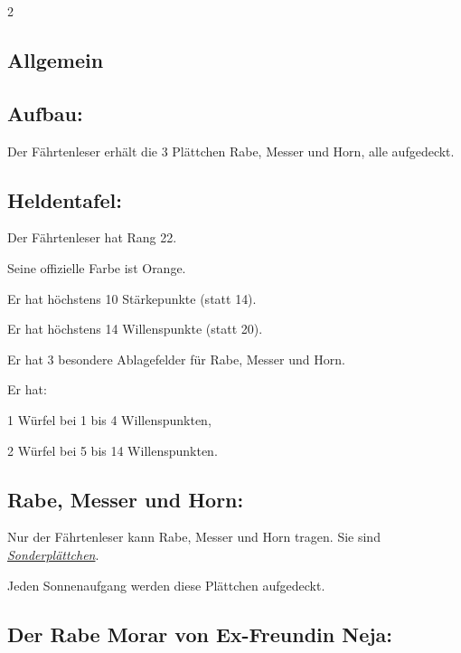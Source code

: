 \documentclass[10pt, a4paper, oneside]{book}
\newcommand{\fan}[1]{\textit{#1}}
\begin{document}
\begin{multicols*}{2}\raggedcolumns


\begin{nobgcolor}

\section{Allgemein}


\subsection{Aufbau:}

Der Fährtenleser erhält die 3 Plättchen Rabe, Messer und Horn, alle aufgedeckt.



\subsection{Heldentafel:}

Der Fährtenleser hat Rang 22.

Seine offizielle Farbe ist Orange.

Er hat höchstens 10 Stärkepunkte (statt 14).

Er hat höchstens 14 Willenspunkte (statt 20).

Er hat 3 besondere Ablagefelder für Rabe, Messer und Horn.

Er hat:

\bullet{} 1 Würfel bei 1 bis 4 Willenspunkten,

\bullet{} 2 Würfel bei 5 bis 14 Willenspunkten.



\subsection{Rabe, Messer und Horn:}

Nur der Fährtenleser kann Rabe, Messer und Horn tragen. Sie sind \hyperref[gegenstaende-und-sonderplaettchen]{\fan{Sonderplättchen}}.
\supercite{6952}

Jeden Sonnenaufgang werden diese Plättchen aufgedeckt.
\supercite{nh-begleitheft}







\subsection{Der Rabe Morar von Ex-Freundin Neja:}


\end{nobgcolor}
\end{multicols*}
\end{document}
